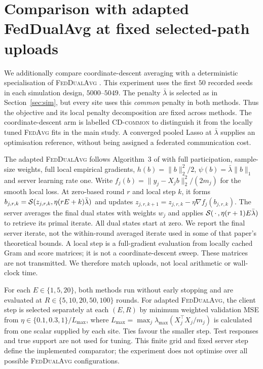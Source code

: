 \section{Comparison with adapted FedDualAvg at fixed selected-path uploads}
\label{sec:budget}

We additionally compare coordinate-descent averaging with a deterministic
specialisation of \textsc{FedDualAvg} \citep{yuan2021fco}. This experiment uses
the first $50$ recorded seeds in each simulation design, $5000$--$5049$.
The penalty $\bar\lambda$ is selected as in Section~\ref{sec:sim}, but every
site uses this \emph{common} penalty in both methods. Thus the objective and
its local penalty decomposition are fixed across methods. The
coordinate-descent arm is labelled \textsc{CD-common} to distinguish it
from the locally tuned \textsc{FedAvg} fits in the main study. A converged
pooled Lasso at $\bar\lambda$ supplies an optimisation reference, without
being assigned a federated communication cost.

The adapted \textsc{FedDualAvg} follows Algorithm~3 of \citet{yuan2021fco}
with full participation, sample-size weights, full local empirical
gradients, $h(b)=\|b\|_2^2/2$, $\psi(b)=\bar\lambda\|b\|_1$ and server
learning rate one. Write $f_j(b)=\|y_j-X_jb\|_2^2/(2m_j)$ for the smooth
local loss. At zero-based round $r$ and local step $k$, it forms
$b_{j,r,k}=\mathcal{S}(z_{j,r,k},\eta(rE+k)\bar\lambda)$ and updates
$z_{j,r,k+1}=z_{j,r,k}-\eta\nabla f_j(b_{j,r,k})$.
The server averages the final dual states with weights $w_j$ and applies
$\mathcal{S}(\,\cdot\,,\eta(r+1)E\bar\lambda)$ to retrieve its primal iterate. All dual
states start at zero. We report the final server iterate, not the
within-round averaged iterate used in some of that paper's theoretical
bounds. A local step is a full-gradient evaluation from locally cached Gram
and score matrices; it is not a coordinate-descent sweep. These matrices
are not transmitted. We therefore match uploads, not local arithmetic or
wall-clock time.

For each $E\in\{1,5,20\}$, both methods run without early stopping and are
evaluated at $R\in\{5,10,20,50,100\}$ rounds. For adapted
\textsc{FedDualAvg}, the client step is selected separately at each
$(E,R)$ by minimum weighted validation MSE from
$\eta\in\{0.1,0.3,1\}/L_{\max}$, where
$L_{\max}=\max_j\lambda_{\max}(X_j^\top X_j/m_j)$ is calculated from
one scalar supplied by each site. Ties favour the smaller step. Test
responses and true support are not used for tuning. This finite grid and
fixed server step define the implemented comparator; the experiment does
not optimise over all possible \textsc{FedDualAvg} configurations.

